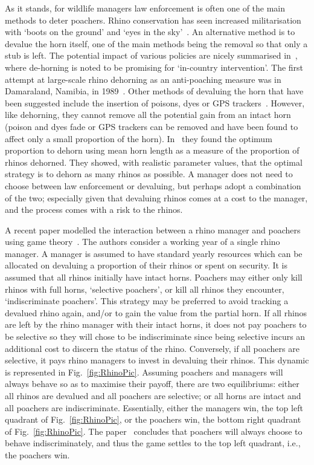 \documentclass[10pt]{article}
\begin{document}
As it stands, for wildlife managers law enforcement is often one of the main methods
to deter poachers. Rhino conservation has seen increased militarisation with `boots
on the ground' and `eyes in the sky'~\cite{duffy_st}. An alternative method is to
devalue the horn itself, one of the main  methods being the removal so that only
a stub is left. The potential impact of various policies are nicely summarised
in~\cite{crookes2016categorisation}, where de-horning is noted to be promising
for `in-country intervention'.
The first attempt at large-scale rhino dehorning as an anti-poaching
measure was in Damaraland, Namibia, in 1989~\cite{Milner1992}. Other methods
of devaluing the horn that have been suggested include
the insertion of poisons, dyes or GPS trackers~\cite{Gill2010, Smith1993}. However,
like dehorning, they cannot remove all the potential gain from an intact horn
(poison and dyes fade or GPS trackers can be removed and have been found to affect
only a small proportion of the horn).
In~\cite{Milner1992, milner1999many} they found the
optimum proportion to dehorn using mean horn length as a measure of the
proportion of rhinos dehorned. They showed, with realistic parameter values,
that the optimal strategy is to dehorn as many rhinos as possible.
A manager does not need to choose between law enforcement or devaluing, but
perhaps adopt a combination of the two; especially given that devaluing rhinos
comes at a cost to the manager, and the process comes with a risk to the rhinos.

A recent paper modelled the interaction between a rhino manager and poachers
using game theory~\cite{Lee}. The authors consider a working year of a single
rhino manager. A manager is assumed to have standard yearly resources which
can be allocated on devaluing a proportion of their rhinos or spent on security.
It is assumed that all rhinos initially have intact horns. Poachers may either only
kill rhinos with full horns, `selective poachers', or kill all rhinos they encounter,
`indiscriminate poachers'. This strategy may be preferred to avoid tracking a
devalued rhino again, and/or to gain the value from the partial horn. If all rhinos
are left by the rhino manager with their intact horns, it does not pay poachers to
be selective so they will chose to be indiscriminate since being selective incurs
an additional cost to discern the status of the rhino. Conversely, if all poachers are
selective, it pays rhino managers to invest in devaluing their rhinos.
This dynamic is represented in Fig.~\ref{fig:RhinoPic}.
Assuming poachers and managers will always behave so as to maximise their payoff,
there are two equilibriums: either all rhinos are devalued and all poachers are selective;
or all horns are intact and all poachers are indiscriminate. Essentially, either the managers
win, the top left quadrant of Fig.~\ref{fig:RhinoPic}, or the poachers win, the bottom
right quadrant of Fig.~\ref{fig:RhinoPic}. The paper~\cite{Lee} concludes that poachers will
always choose to behave indiscriminately, and thus the game settles to the top
left quadrant, i.e., the poachers win.
\end{document}
